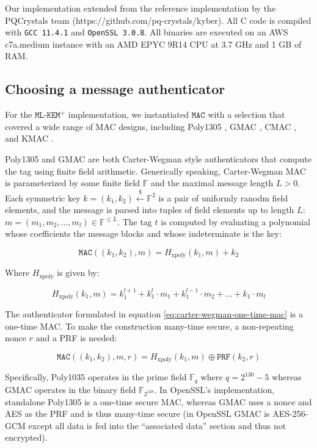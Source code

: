 \documentclass[journal=tches,submission]{iacrtrans}
\newcommand{\mac}{\texttt{MAC}}
\newcommand{\leftsample}{\stackrel{\$}{\leftarrow}}
\begin{document}
Our implementation extended from the reference implementation by the PQCrystals team (https://github.com/pq-crystals/kyber). All C code is compiled with \texttt{GCC 11.4.1} and \texttt{OpenSSL 3.0.8}. All binaries are executed on an AWS c7a.medium instance with an AMD EPYC 9R14 CPU at 3.7 GHz and 1 GB of RAM.

\subsection{Choosing a message authenticator}
For the $\texttt{ML-KEM}^+$ implementation, we instantiated $\mac$ with a selection that covered a wide range of MAC designs, including Poly1305 \cite{bernstein2005poly1305}, GMAC \cite{mcgrew2004galois}, CMAC \cite{iwata2003omac}\cite{black2000cbc}, and KMAC \cite{kelsey2016sha}.

Poly1305 and GMAC are both Carter-Wegman style authenticators that compute the tag using finite field arithmetic. Generically speaking, Carter-Wegman MAC is parameterized by some finite field $\mathbb{F}$ and the maximal message length $L > 0$. Each symmetric key $k = (k_1, k_2) \leftsample \mathbb{F}^2$ is a pair of uniformly ranodm field elements, and the message is parsed into tuples of field elements up to length $L$: $m = (m_1, m_2, \ldots, m_l) \in \mathbb{F}^{\leq L}$. The tag $t$ is computed by evaluating a polynomial whose coefficients the message blocks and whose indeterminate is the key:

\begin{equation}\label{eq:carter-wegman-one-time-mac}
    \mac((k_1, k_2), m) = H_\text{xpoly}(k_1, m) + k_2
\end{equation}

Where $H_\text{xpoly}$ is given by:

\begin{equation*}
    H_\text{xpoly}(k_1, m) = k_1^{l+1} + k_1^l \cdot m_1 + k_1^{l-1} \cdot m_2 + \ldots + k_1 \cdot m_l
\end{equation*}

The authenticator formulated in equation \ref{eq:carter-wegman-one-time-mac} is a one-time MAC. To make the construction many-time secure, a non-repeating nonce $r$ and a PRF is needed:

\begin{equation*}
    \mac((k_1, k_2), m, r) = H_\text{xpoly}(k_1, m) \oplus \texttt{PRF}(k_2, r)
\end{equation*}

Specifically, Poly1035 operates in the prime field $\mathbb{F}_q$ where $q = 2^{130} - 5$ whereas GMAC operates in the binary field $\mathbb{F}_{2^{128}}$. In OpenSSL's implementation, standalone Poly1305 is a one-time secure MAC, whereas GMAC uses a nonce and AES as the PRF and is thus many-time secure (in OpenSSL GMAC is AES-256-GCM except all data is fed into the ``associated data'' section and thus not encrypted).
\end{document}
